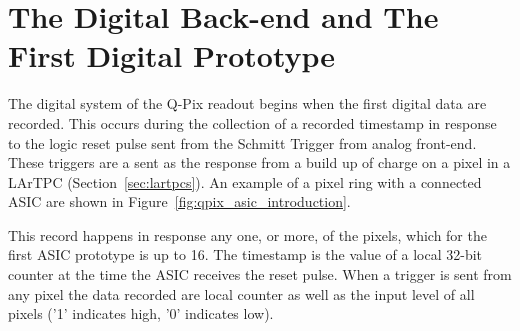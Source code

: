 \section{The Digital Back-end and The First Digital Prototype}\label{sec:digital_prototype}
The digital system of the Q-Pix readout begins when the first digital data are recorded.
This occurs during the collection of a recorded timestamp in response to the logic reset pulse sent from the Schmitt Trigger from analog front-end.
These triggers are a sent as the response from a build up of charge on a pixel in a LArTPC (Section~\ref{sec:lartpcs}).
An example of a pixel ring with a connected ASIC are shown in Figure~\ref{fig:qpix_asic_introduction}.

This record happens in response any one, or more, of the pixels, which for the first ASIC prototype is up to 16.
The timestamp is the value of a local 32-bit counter at the time the ASIC receives the reset pulse.
When a trigger is sent from any pixel the data recorded are local counter as well as the input level of all pixels ('1' indicates high, '0' indicates low).

